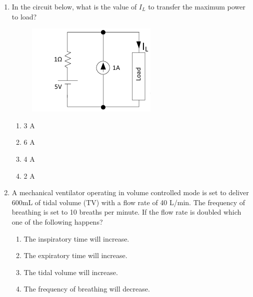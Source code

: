 \documentclass[a4paper,12pt]{exam}
\numberwithin{equation}{enumi}
\numberwithin{figure}{enumi}
\begin{document}
\begin{enumerate}
\begin{enumerate}
\item fh = 8 Hz, fl = 12 Hz, fs = 12 Hz 
\item fh = 4 Hz, fl = 6 Hz, fs = 24 Hz 
\item fh = 6 Hz, fl = 4 Hz, fs = 12 Hz
\item fh = 8 Hz, fl = 12 Hz, fs = 48 Hz 
\end{enumerate}  

\item In the circuit below, what is the value of $I_L$ to transfer the maximum power to load? 

\begin{figure}[H]
\centering
\includegraphics[width=0.5\columnwidth]{figs/Q46.png}
\label{fig:Q46.png}
\end{figure}

\hfill{}

\begin{multicols}{4}
\begin{enumerate}
\item 3 A
\item 6 A
\item 4 A
\item 2 A
\end{enumerate}  
\end{multicols}

\item A mechanical ventilator operating in volume controlled mode is set to deliver 600mL of tidal volume (TV) with a flow rate of 40 L/min. The frequency of breathing is set  to 10 breaths per minute. If the flow rate is doubled which one of the following  happens? 

\hfill{}

\begin{enumerate}
\item The inspiratory time will increase.
\item The expiratory time will increase.
\item The tidal volume will increase. 
\item The frequency of breathing will decrease. 
\end{enumerate}  


\end{enumerate}
\end{document}
